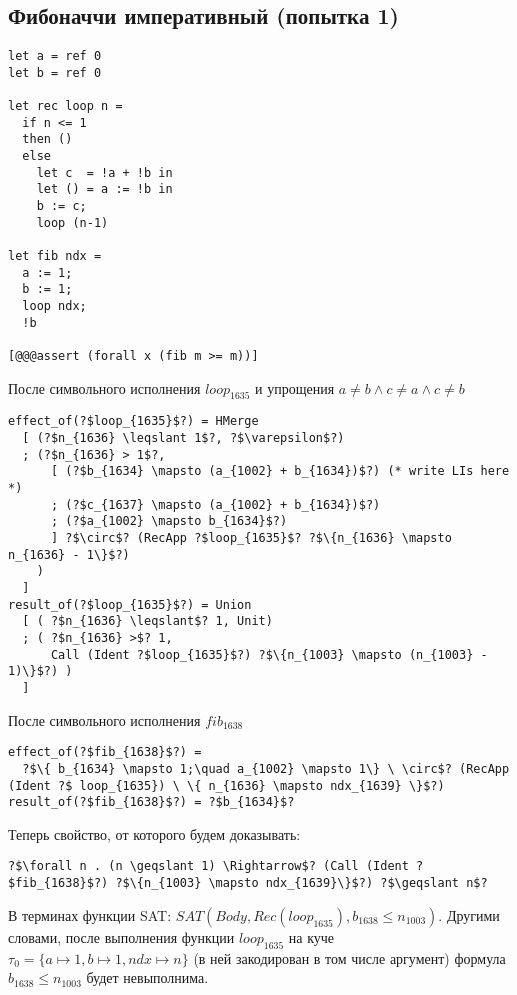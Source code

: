 \documentclass{article}
\begin{document}
\subsection{Фибоначчи императивный (попытка 1)}
\begin{verbatim}  
let a = ref 0
let b = ref 0

let rec loop n = 
  if n <= 1
  then ()
  else 
    let c  = !a + !b in 
    let () = a := !b in
    b := c;
    loop (n-1) 
 
let fib ndx = 
  a := 1;
  b := 1;
  loop ndx;
  !b

[@@@assert (forall x (fib m >= m))]

\end{verbatim}
После символьного исполнения $loop_{1635}$ и упрощения $a \neq b \wedge c \neq a \wedge c \neq b$
\begin{verbatim}
effect_of(?$loop_{1635}$?) = HMerge 
  [ (?$n_{1636} \leqslant 1$?, ?$\varepsilon$?)
  ; (?$n_{1636} > 1$?,
      [ (?$b_{1634} \mapsto (a_{1002} + b_{1634})$?) (* write LIs here *)
      ; (?$c_{1637} \mapsto (a_{1002} + b_{1634})$?)
      ; (?$a_{1002} \mapsto b_{1634}$?)          
      ] ?$\circ$? (RecApp ?$loop_{1635}$? ?$\{n_{1636} \mapsto n_{1636} - 1\}$?)
    )
  ]
result_of(?$loop_{1635}$?) = Union 
  [ ( ?$n_{1636} \leqslant$? 1, Unit)     
  ; ( ?$n_{1636} >$? 1,
      Call (Ident ?$loop_{1635}$?) ?$\{n_{1003} \mapsto (n_{1003} - 1)\}$?) )
  ]
\end{verbatim}
После символьного исполнения $fib_{1638}$
\begin{verbatim}
effect_of(?$fib_{1638}$?) = 
  ?$\{ b_{1634} \mapsto 1;\quad a_{1002} \mapsto 1\} \ \circ$? (RecApp (Ident ?$ loop_{1635}) \ \{ n_{1636} \mapsto ndx_{1639} \}$?)
result_of(?$fib_{1638}$?) = ?$b_{1634}$? 
\end{verbatim}

Теперь свойство, от которого будем доказывать: 
\begin{verbatim}
?$\forall n . (n \geqslant 1) \Rightarrow$? (Call (Ident ?$fib_{1638}$?) ?$\{n_{1003} \mapsto ndx_{1639}\}$?) ?$\geqslant n$?
\end{verbatim}

В терминах функции SAT: $SAT(Body, Rec(loop_{1635}), b_{1638} \leqslant n_{1003})$. Другими словами, после выполнения функции $loop_{1635}$  на куче $\tau_0=\{a\mapsto 1, b\mapsto 1, ndx\mapsto n\}$ (в ней закодирован в том числе аргумент) формула $b_{1638} \leqslant n_{1003}$ будет невыполнима.
\end{document}
